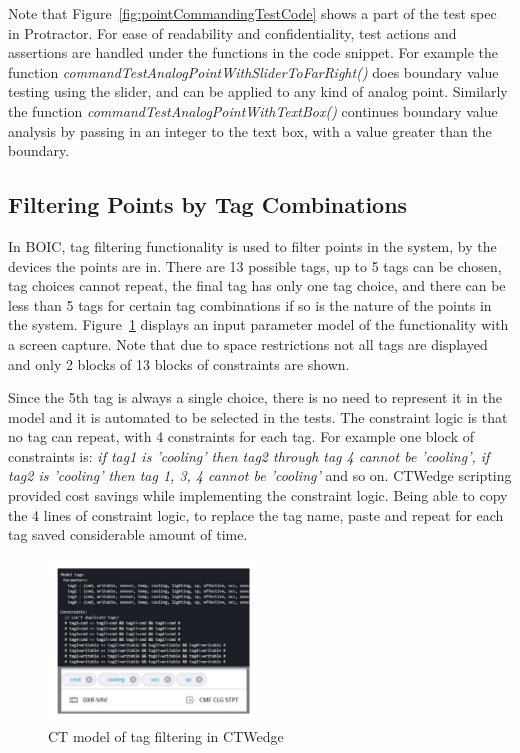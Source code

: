 \documentclass[conference]{IEEEtran}
\begin{document}
	Note that Figure~\ref{fig:pointCommandingTestCode} shows a part of the test spec in Protractor. 
	For ease of readability and confidentiality, test actions and assertions are handled under the functions in the code snippet. 
	For example the function \textit{commandTestAnalogPointWithSliderToFarRight()} does boundary value testing using the slider, and can be applied to any kind of analog point.
	Similarly the function \textit{commandTestAnalogPointWithTextBox()} continues boundary value analysis by passing in an integer to the text box, with a value greater than the boundary.

	\subsection{Filtering Points by Tag Combinations }

	In BOIC, tag filtering functionality is used to filter points in the system, by the devices the points are in.
	There are 13 possible tags, up to 5 tags can be chosen, tag choices cannot repeat, the final tag has only one tag choice, and there can be less than 5 tags for certain tag combinations if so is the nature of the points in the system.
	Figure~\ref{fig:tagFilterModel} displays an input parameter model of the functionality with a screen capture. 
	Note that due to space restrictions not all tags are displayed and only 2 blocks of 13 blocks of constraints are shown.
	
	Since the 5th tag is always a single choice, there is no need to represent it in the model and it is automated to be selected in the tests.
	The constraint logic is that no tag can repeat, with 4 constraints for each tag.
	For example one block of constraints is: \textit{if tag1 is 'cooling' then tag2 through tag 4 cannot be 'cooling', if tag2 is 'cooling' then tag 1, 3, 4 cannot be 'cooling'} and so on.
	CTWedge scripting provided cost savings while implementing the constraint logic. 
	Being able to copy the 4 lines of constraint logic, to replace the tag name, paste and repeat for each tag saved considerable amount of time.

	\begin{figure}[!h]
		\includegraphics[width=0.50\textwidth,]{tagFilterModel.pdf}
		\caption{CT model of tag filtering in CTWedge}
		\label{fig:tagFilterModel}
	\end{figure}
\end{document}
